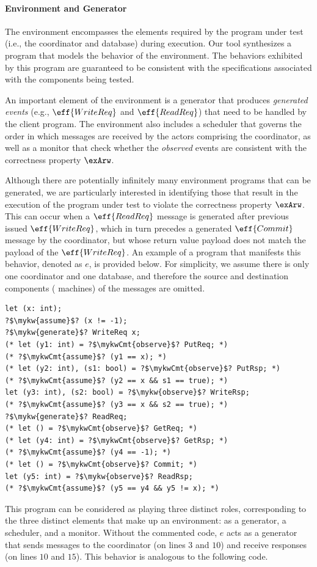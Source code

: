 \paragraph{Environment and Generator} The environment encompasses
the elements required by the program under test (i.e., the
coordinator and database) during execution.  Our tool synthesizes
a program that models the behavior of the environment.  The behaviors
exhibited by this program are guaranteed to be consistent with
the specifications associated with the components being tested.

An important element of the environment is a generator that produces
\emph{generated events} (e.g., $\eff{WriteReq}$ and $\eff{ReadReq}$)
that need to be handled by the client program. The environment also
includes a scheduler that governs the order in which messages are
received by the actors comprising the coordinator, as well as a
monitor that check whether the \emph{observed} events are consistent
with the correctness property $\exArw$.

Although there are potentially infinitely many environment programs
that can be generated, we are particularly interested in identifying
those that result in the execution of the program under test to
violate the correctness property $\exArw$. This can occur when a
$\eff{ReadReq}$ message is generated after previous issued $\eff{WriteReq}$, which in turn precedes a generated
$\eff{Commit}$ message by the coordinator, but whose return value
payload does not match the payload of the $\eff{WriteReq}$.  An
example of a program that manifests this behavior, denoted as $e$, is
provided below. For simplicity, we assume there is only one
coordinator and one database, and therefore the source and destination
components ( machines) of the messages are omitted.

\begin{verbatim}
let (x: int);
?$\mykw{assume}$? (x != -1);
?$\mykw{generate}$? WriteReq x;
(* let (y1: int) = ?$\mykwCmt{observe}$? PutReq; *)
(* ?$\mykwCmt{assume}$? (y1 == x); *)
(* let (y2: int), (s1: bool) = ?$\mykwCmt{observe}$? PutRsp; *)
(* ?$\mykwCmt{assume}$? (y2 == x && s1 == true); *)
let (y3: int), (s2: bool) = ?$\mykw{observe}$? WriteRsp;
(* ?$\mykwCmt{assume}$? (y3 == x && s2 == true); *)
?$\mykw{generate}$? ReadReq;
(* let () = ?$\mykwCmt{observe}$? GetReq; *)
(* let (y4: int) = ?$\mykwCmt{observe}$? GetRsp; *)
(* ?$\mykwCmt{assume}$? (y4 == -1); *)
(* let () = ?$\mykwCmt{observe}$? Commit; *)
let (y5: int) = ?$\mykw{observe}$? ReadRsp;
(* ?$\mykwCmt{assume}$? (y5 == y4 && y5 != x); *)
\end{verbatim}
This program can be considered as playing three distinct roles, corresponding
to the three distinct elements that make up an environment: as a
generator, a scheduler, and a monitor. Without the commented code, $e$
acts as a generator that sends messages to the coordinator (on lines
$3$ and $10$) and receive responses (on lines $10$ and $15$). This
behavior is analogous to the following  code.

